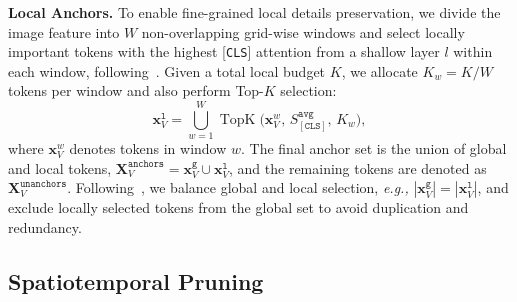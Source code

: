 \noindent \textbf{Local Anchors.}
To enable fine-grained local details preservation, we divide the image feature into $W$ non-overlapping grid-wise windows and select locally important tokens with the highest [\texttt{CLS}] attention from a shallow layer $l$ within each window, following~\cite{li2024llava,chen2024far,zhang2024llavanextvideo}.
Given a total local budget $K$, we allocate $K_w=K/W$
tokens per window and also perform Top-$K$ selection:
\begin{equation}
    \mathbf{x}_V^{\mathtt{l}}
    =
    \bigcup_{w=1}^W
    \operatorname{TopK}\big(
        \mathbf{x}_V^w,\,
        S_{[\mathtt{CLS}]}^{\texttt{avg}},\,
        K_w
    \big),
\end{equation}
where $\mathbf{x}_V^w$ denotes tokens in window $w$.
The final anchor set is the union of global and local tokens,
$\mathbf{X}_V^{\texttt{anchors}} = \mathbf{x}_V^{\mathtt{g}} \cup \mathbf{x}_V^{\mathtt{l}}$,
and the remaining tokens are denoted as
$\mathbf{X}_V^{\texttt{unanchors}}$.
Following~\cite{zhang2025vscan}, we balance global and local selection, \textit{e.g.,} $|\mathbf{x}_V^{\mathtt{g}}| = |\mathbf{x}_V^{\mathtt{l}}|$, and exclude locally selected tokens from the global set to avoid duplication and redundancy.



\subsection{Spatiotemporal Pruning}
\label{sec:spatiotemporal}

